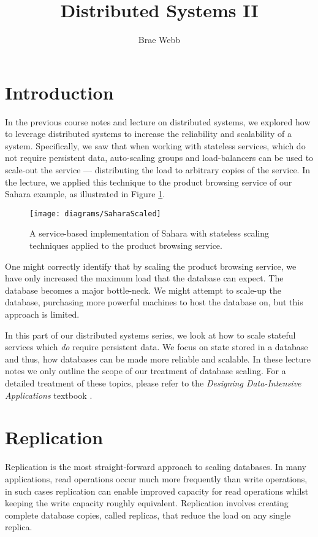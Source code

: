 \title{Distributed Systems II}
\author{Brae Webb}
\date{}

\maketitle

\section{Introduction}
In the previous course notes \cite{distributed1-notes} and lecture \cite{distributed1-slides} on distributed systems,
we explored how to leverage distributed systems to increase the reliability and scalability of a system.
Specifically, we saw that when working with stateless services, which do not require persistent data,
auto-scaling groups and load-balancers can be used to scale-out the service --- distributing the load to arbitrary copies of the service.
In the lecture, we applied this technique to the product browsing service of our Sahara example,
as illustrated in Figure \ref{fig:scaled-sahara}.

\begin{figure}[H]
\begin{center}
\texttt{[image: diagrams/SaharaScaled]}
\end{center}
\caption{A service-based implementation of Sahara with stateless scaling techniques applied to the product browsing service.}
\label{fig:scaled-sahara}
\end{figure}

One might correctly identify that by scaling the product browsing service,
we have only increased the maximum load that the database can expect.
The database becomes a major bottle-neck.
We might attempt to scale-up the database,
purchasing more powerful machines to host the database on,
but this approach is limited.

In this part of our distributed systems series,
we look at how to scale stateful services which \textsl{do} require persistent data.
We focus on state stored in a database and thus,
how databases can be made more reliable and scalable.
In these lecture notes we only outline the scope of our treatment of database scaling.
For a detailed treatment of these topics,
please refer to the \textit{Designing Data-Intensive Applications} textbook \cite{data-intensive}.

\section{Replication}
Replication is the most straight-forward approach to scaling databases.
In many applications, read operations occur much more frequently than write operations,
in such cases replication can enable improved capacity for read operations whilst keeping the write capacity roughly equivalent.
Replication involves creating complete database copies, called replicas,
that reduce the load on any single replica.

